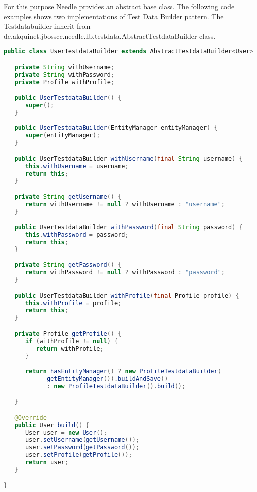 For this purpose Needle provides an abstract base class. The following code examples shows two implementations of Test Data Builder pattern. The Testdatabuilder inherit from 
de.akquinet.jbosscc.needle.db.testdata.\-AbstractTestdataBuilder class. 

\begin{lstlisting}[language={JAVA},caption=User Testdatabuilder]
public class UserTestdataBuilder extends AbstractTestdataBuilder<User> {

   private String withUsername;
   private String withPassword;
   private Profile withProfile;

   public UserTestdataBuilder() {
      super();
   }

   public UserTestdataBuilder(EntityManager entityManager) {
      super(entityManager);
   }

   public UserTestdataBuilder withUsername(final String username) {
      this.withUsername = username;
      return this;
   }

   private String getUsername() {
      return withUsername != null ? withUsername : "username";
   }

   public UserTestdataBuilder withPassword(final String password) {
      this.withPassword = password;
      return this;
   }

   private String getPassword() {
      return withPassword != null ? withPassword : "password";
   }

   public UserTestdataBuilder withProfile(final Profile profile) {
      this.withProfile = profile;
      return this;
   }

   private Profile getProfile() {
      if (withProfile != null) {
         return withProfile;
      }

      return hasEntityManager() ? new ProfileTestdataBuilder(
            getEntityManager()).buildAndSave()
            : new ProfileTestdataBuilder().build();

   }

   @Override
   public User build() {
      User user = new User();
      user.setUsername(getUsername());
      user.setPassword(getPassword());
      user.setProfile(getProfile());
      return user;
   }

}
\end{lstlisting}

